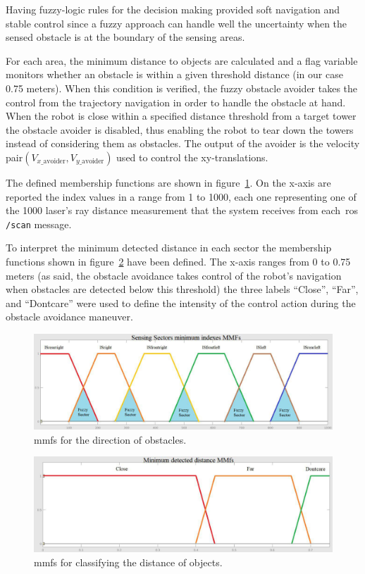 Having fuzzy-logic rules for the decision making provided soft navigation and stable control since a fuzzy approach can handle well the uncertainty when the sensed obstacle is at the boundary of the sensing areas. 

For each area, the minimum distance to objects are calculated and a flag variable monitors whether an obstacle is within a given threshold distance (in our case 0.75 meters). When this condition is verified, the fuzzy obstacle avoider takes the control from the trajectory navigation in order to handle the obstacle at hand. When the robot is close within a specified distance threshold from a target tower the obstacle avoider is disabled, thus enabling the robot to tear down the towers instead of considering them as obstacles. The output of the avoider is the velocity pair$(V_{x\_\text{avoider}}, V_{y\_ \text{avoider}})$ used to control the xy-translations.

The defined membership functions are shown in figure~\ref{fig:indexesmmf}. On the x-axis are reported the index values in a range from 1 to 1000, each one representing one of the 1000 laser's ray distance measurement that the system receives from each~\gls{ros} \verb|/scan| message.

To interpret the minimum detected distance in each sector the membership functions shown in figure~\ref{fig:minmmf} have been defined. The x-axis ranges from 0 to 0.75 meters (as said, the obstacle avoidance takes control of the robot's navigation when obstacles are detected below this threshold) the three labels ``Close'', ``Far'', and ``Dontcare'' were used to define the intensity of the control action during the obstacle avoidance maneuver.

\begin{figure}[H]
	\centering
	\includegraphics[width=\textwidth]{images/03-foundation/indexesmmf}
	\caption{\glspl{mmf} for the direction of obstacles.} 
	\label{fig:indexesmmf} 
\end{figure}
\begin{figure}[H]
	\centering
	\includegraphics[width=\textwidth]{images/03-foundation/minmmf}
	\caption{\glspl{mmf} for classifying the distance of objects.}
	\label{fig:minmmf} 
\end{figure}

